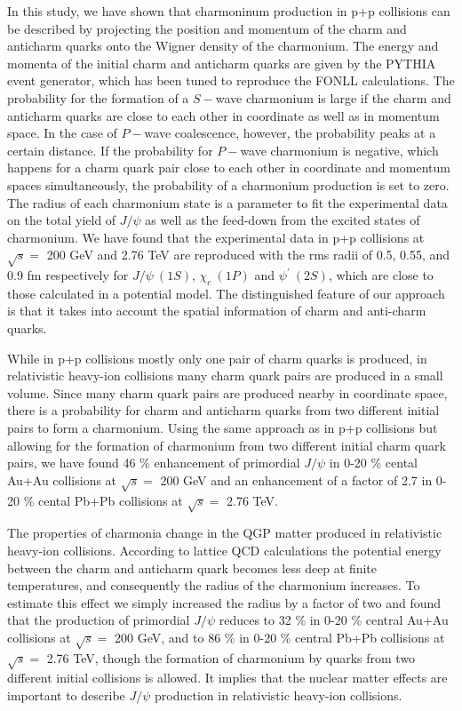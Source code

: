 \documentclass[twocolumn,aps,superscriptaddress,showpacs,nofootinbib,floatfix]{revtex4}
\begin{document}
In this study, we have shown that charmoninum production in p+p collisions can be described by projecting the position and momentum of the charm and anticharm quarks onto the Wigner density of the charmonium. The energy and momenta of the initial charm and anticharm quarks are given by the PYTHIA event generator, which has been tuned to reproduce the FONLL calculations. The probability for the formation of a $S-$wave charmonium is large if the charm and anticharm quarks are close to each other in coordinate as well as in momentum space. In the case of $P-$wave coalescence, however, the probability peaks at a certain distance. If the probability for $P-$wave charmonium is negative, which happens for a charm quark pair close to each other in coordinate and momentum spaces simultaneously, the probability of a charmonium production is set to zero. The radius of each charmonium state is a parameter to fit the experimental data on the total yield of $J/\psi$ as well as the feed-down from the excited states of charmonium.
We have found that the experimental data in p+p collisions at $\sqrt{s}=$ 200 GeV and 2.76 TeV are reproduced with the rms radii of 0.5, 0.55, and 0.9 fm respectively for $J/\psi~(1S)$, $\chi_c~(1P)$ and $\psi^\prime~(2S)$, which are close to those calculated in a potential model. The distinguished feature of our approach is that it takes into account the spatial information of charm and anti-charm quarks.

While in p+p collisions mostly only one pair of charm quarks is produced, in relativistic heavy-ion collisions many charm quark pairs are produced in a small volume. Since many charm quark pairs are produced nearby in coordinate space, there is a probability for charm and anticharm quarks from two different initial pairs to form a charmonium.
Using the same approach as in p+p collisions but allowing for the formation of charmonium from two different initial charm quark pairs, we have found 46 \% enhancement of primordial $J/\psi$ in 0-20 \% cental Au+Au collisions at $\sqrt{s}=$ 200 GeV and  an enhancement of a factor of 2.7 in 0-20 \% cental Pb+Pb collisions at $\sqrt{s}=$ 2.76 TeV.

The properties of charmonia change in the QGP matter produced in relativistic heavy-ion collisions. According to lattice QCD calculations the potential energy between the charm and anticharm quark becomes less deep at finite temperatures, and consequently the radius of the charmonium increases. To estimate this effect we simply increased the radius by a factor of two
and found that the production of primordial $J/\psi$ reduces to 32 \% in 0-20 \% central Au+Au collisions at $\sqrt{s}=$ 200 GeV, and to 86 \%  in 0-20 \% central Pb+Pb collisions at $\sqrt{s}=$ 2.76 TeV, though the formation of charmonium
by quarks from two different initial collisions is allowed.
It implies that the nuclear matter effects are important to describe $J/\psi$ production in relativistic heavy-ion collisions.
\end{document}
